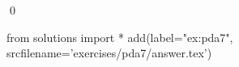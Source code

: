 
\begin{ex} 
  \label{ex:pda7}
  
  \qed
\end{ex} 
\begin{python0}
from solutions import *
add(label="ex:pda7",
    srcfilename='exercises/pda7/answer.tex') 
\end{python0}
